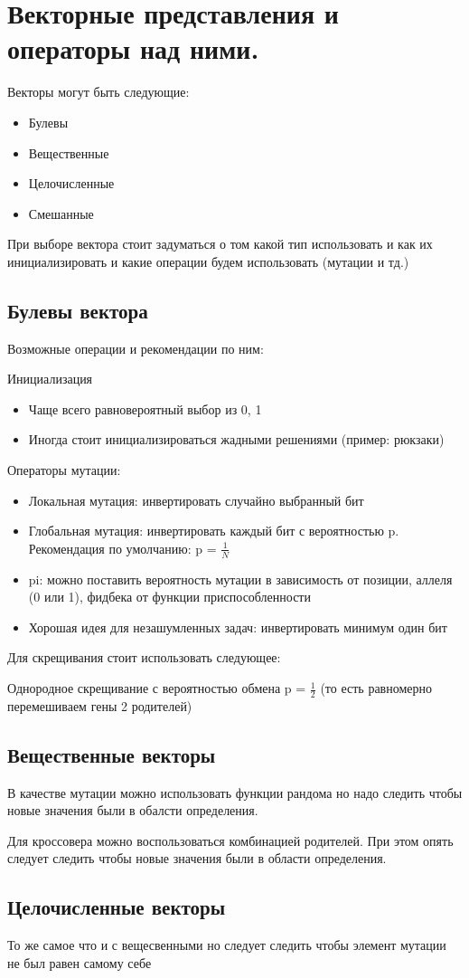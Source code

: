 \section{Векторные представления и операторы над ними.}
Векторы могут быть следующие: 
\begin{itemize}
\item Булевы
\item Вещественные
\item Целочисленные
\item Смешанные
\end{itemize}
При выборе вектора стоит задуматься о том какой тип использовать и как их инициализировать и какие операции будем использовать (мутации и тд.)

\subsection*{Булевы вектора}
Возможные операции и рекомендации по ним:

Инициализация
\begin{itemize}
\item Чаще всего равновероятный выбор из {0, 1}
\item Иногда стоит инициализироваться жадными решениями (пример: рюкзаки)
\end{itemize}
Операторы мутации:
\begin{itemize}
\item Локальная мутация: инвертировать случайно выбранный бит
\item Глобальная мутация: инвертировать каждый бит с вероятностью p. Рекомендация по умолчанию: p = $\frac{1}{N}$
\item pi: можно поставить вероятность мутации в зависимость от позиции, аллеля (0 или 1), фидбека от функции приспособленности
\item Хорошая идея для незашумленных задач: инвертировать минимум один бит
\end{itemize}
Для скрещивания стоит использовать следующее:

Однородное скрещивание с вероятностью обмена p = $\frac{1}{2}$ (то есть равномерно перемешиваем гены 2 родителей)

\subsection*{Вещественные векторы}
В качестве мутации можно использовать функции рандома но надо следить чтобы новые значения были в обалсти определения.

Для кроссовера можно воспользоваться комбинацией родителей. При этом опять следует следить чтобы новые значения были в области определения.

\subsection*{Целочисленные векторы}

То же самое что и с вещесвенными но следует следить чтобы элемент мутации не был равен самому себе
